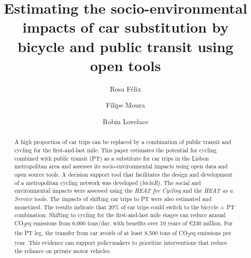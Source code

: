 \documentclass[runningheads]{llncs}
\begin{document}
\title{Estimating the socio-environmental impacts of car substitution by
bicycle and public transit using open tools}
%
%
\author{Rosa Félix \and Filipe
Moura \and Robin
Lovelace}


%


\maketitle              %
%
\begin{abstract}
A high proportion of car trips can be replaced by a combination of
public transit and cycling for the first-and-last mile. This paper
estimates the potential for cycling combined with public transit (PT) as
a substitute for car trips in the Lisbon metropolitan area and assesses
its socio-environmental impacts using open data and open source tools. A
decision support tool that facilitates the design and development of a
metropolitan cycling network was developed (\emph{biclaR}). The social
and environmental impacts were assessed using the \emph{HEAT for
Cycling} and the \emph{HEAT as a Service} tools. The impacts of shifting
car trips to PT were also estimated and monetized. The results indicate
that 20\% of car trips could switch to the bicycle + PT combination.
Shifting to cycling for the first-and-last mile stages can reduce annual
CO\textsubscript{2}eq emissions from 6,000 tons/day, with benefits over
10 years of €230 million. For the PT leg, the transfer from car avoids
of at least 8,500 tons of CO\textsubscript{2}eq emissions per year. This
evidence can support policymakers to prioritize interventions that
reduce the reliance on private motor vehicles.


\end{abstract}
\end{document}

